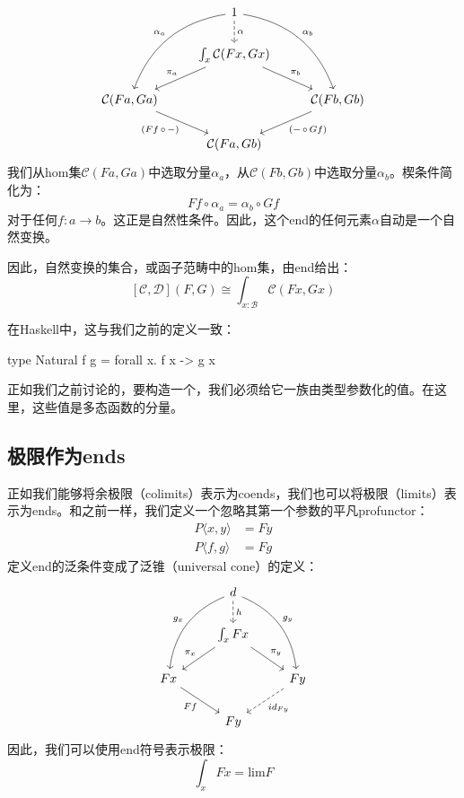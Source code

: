 \documentclass[DaoFP]{subfiles}
\begin{document}
\[
 \begin{tikzcd}
 & 1
 \arrow[d, dashed, "\alpha"]
\arrow[ddl, bend right, "\alpha_a"']
 \arrow[ddr, bend left, "\alpha_b"]
 \\
 & \int_{x} \mathcal{C}(F x, G x)
 \arrow[ld, "\pi_a"']
 \arrow[rd, "\pi_b"]
 \\
  \mathcal{C} ( F a, G a )
 \arrow[dr, "{(F f \, \circ \, -)}"']
 && \mathcal{C} ( F b, G b )
 \arrow[dl, "{(- \, \circ\, G f)}"]
 \\
 &  \mathcal{C} ( F a, G b )
 \end{tikzcd}
\]
我们从hom集$\mathcal{C} ( F a, G a )$中选取分量$\alpha_a$，从$\mathcal{C} ( F b, G b )$中选取分量$\alpha_b$。楔条件简化为：
\[ F f \circ \alpha_a = \alpha_b \circ G f \]
对于任何$f \colon a \to b$。这正是自然性条件。因此，这个end的任何元素$\alpha$自动是一个自然变换。

因此，自然变换的集合，或函子范畴中的hom集，由end给出：
\[ [\mathcal{C}, \mathcal{D}] (F, G) \cong \int_{x \colon  \mathcal{B}} \mathcal{C}(F x, G x)\]

在Haskell中，这与我们之前的定义一致：
\begin{haskell}
type Natural f g = forall x. f x -> g x
\end{haskell}

正如我们之前讨论的，要构造一个，我们必须给它一族由类型参数化的值。在这里，这些值是多态函数的分量。

\subsection{极限作为ends}
正如我们能够将余极限（colimits）表示为coends，我们也可以将极限（limits）表示为ends。和之前一样，我们定义一个忽略其第一个参数的平凡profunctor：
\begin{align*}
 P \langle x, y \rangle &= F y \\
 P \langle f, g \rangle &= F g 
\end{align*}
定义end的泛条件变成了泛锥（universal cone）的定义：
\[
 \begin{tikzcd}
 &d
 \arrow[ddl, bend right, "g_x"']
 \arrow[ddr, bend left, "g_y"]
 \arrow[d, dashed, "h"]
 \\
 & \int_x F x
 \arrow[ld, "\pi_x"']
 \arrow[rd, "\pi_y"]
 \\
 F x
 \arrow[dr, "F f"']
 &&F y
 \arrow[dl, dashed, "id_{F y}"]
 \\
 & F y
 \end{tikzcd}
\]
因此，我们可以使用end符号表示极限：
\[ \int_x F x = \text{lim} F \]
\end{document}
